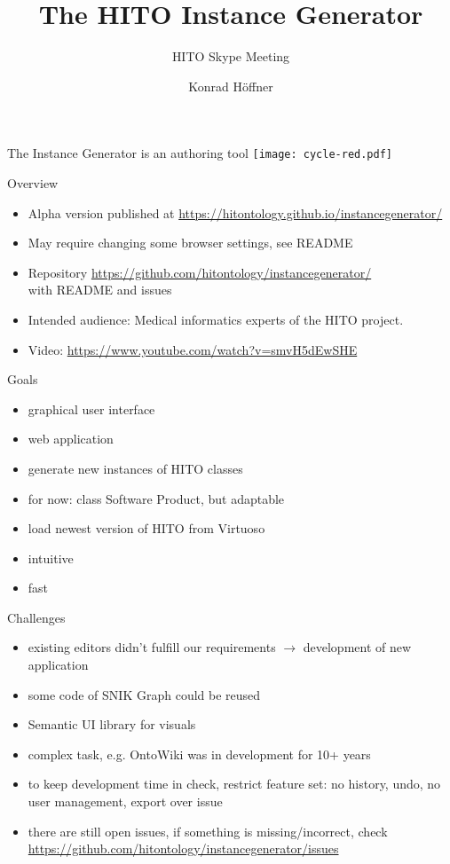 \documentclass[aspectratio=1610]{beamer}
\title{The HITO Instance Generator}
\subtitle{HITO Skype Meeting}
\author{Konrad Höffner}
\begin{document}
\begin{frame}
\titlepage
\end{frame}

\begin{frame}{The Instance Generator is an authoring tool}
\centering
\texttt{[image: cycle-red.pdf]}
\end{frame}

\begin{frame}{Overview}
\begin{itemize}
\item Alpha version published at \url{https://hitontology.github.io/instancegenerator/}
\item May require changing some browser settings, see README
\item Repository \url{https://github.com/hitontology/instancegenerator/}\\with README and issues
\item Intended audience: Medical informatics experts of the HITO project.
\item Video: \url{https://www.youtube.com/watch?v=smvH5dEwSHE}
\end{itemize}
\end{frame}

\begin{frame}{Goals}
\centering
\begin{itemize}
\item graphical user interface
\item web application
\item generate new instances of HITO classes
\item for now: class Software Product, but adaptable
\item load newest version of HITO from Virtuoso 
\item intuitive 
\item fast
\end{itemize}
\end{frame}

\begin{frame}{Challenges}
\begin{itemize}
\item existing editors didn't fulfill our requirements $\rightarrow$ development of new application
\item some code of SNIK Graph could be reused
\item Semantic UI library for visuals
\item complex task, e.g. OntoWiki was in development for 10+ years
\item to keep development time in check, restrict feature set: no history, undo, no user management, export over issue
\item there are still open issues, if something is missing/incorrect, check \url{https://github.com/hitontology/instancegenerator/issues}
\end{itemize}
\end{frame}
\end{document}
